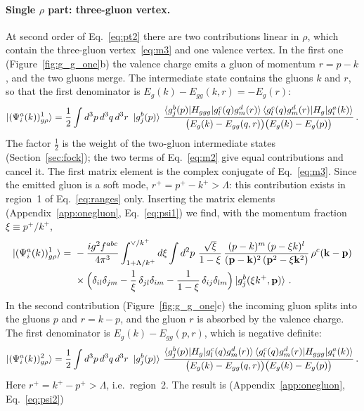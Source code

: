 \paragraph{Single $\rho$ part: three-gluon vertex.} At second order of Eq.~\eqref{eq:pt2} there are two contributions linear in $\rho$, which contain the three-gluon vertex~\eqref{eq:m3} and one valence vertex. In the first one (Figure~\ref{fig:g_g_one}b) the valence charge emits a gluon of momentum $r=p-k$, and the two gluons merge. The intermediate state contains the gluons $k$ and $r$, so that the first denominator is $E_g(k)-E_{gg}(k,r)=-E_g(r)$:
\begin{align}\label{eq:psi1_def}
\ket{(\Psi^a_i(k))^1_{g\rho}}=\frac12\int d^3p\,d^3q\,d^3r\ \ket{g^b_j(p)}\,
\frac{\braket{g^b_j(p)|H_{ggg}|g^c_l(q)g^d_m(r)}\braket{g^c_l(q)g^d_m(r)|H_g|g^a_i(k)}}{\big(E_g(k)-E_{gg}(q,r)\big)\big(E_g(k)-E_g(p)\big)}\,.
\end{align}
The factor $\frac12$ is the weight of the two-gluon intermediate states (Section~\ref{sec:fock}); the two terms of Eq.~\eqref{eq:m2} give equal contributions and cancel it. The first matrix element is the complex conjugate of Eq.~\eqref{eq:m3}. Since the emitted gluon is a soft mode, $r^+=p^+-k^+>\Lambda$: this contribution exists in region~1 of Eq.~\eqref{eq:ranges} only. Inserting the matrix elements (Appendix~\ref{app:onegluon}, Eq.~\eqref{eq:psi1}) we find, with the momentum fraction $\xi\equiv p^+/k^+$,
\begin{align}\label{eq:psi1_xi}
\ket{(\Psi^a_i(k))^1_{g\rho}}=\ &-\frac{ig^2f^{abc}}{4\pi^3}\int_{1+\Lambda/k^+}^{\vee/k^+}d\xi\int d^2p\ \frac{\sqrt\xi}{1-\xi}\,\frac{(p-k)^m\,(p-\xi k)^l}{(\v p-\v k)^2\,(\v p^2-\xi\v k^2)}\,\rho^c(\v k-\v p)\notag\\
&\times\Big(\delta_{il}\delta_{jm}-\frac1\xi\,\delta_{jl}\delta_{im}-\frac{1}{1-\xi}\,\delta_{ij}\delta_{lm}\Big)\ket{g^b_j(\xi k^+,\v p)}\,.
\end{align}
In the second contribution (Figure~\ref{fig:g_g_one}c) the incoming gluon splits into the gluons $p$ and $r=k-p$, and the gluon $r$ is absorbed by the valence charge. The first denominator is $E_g(k)-E_{gg}(p,r)$, which is negative definite:
\begin{align}\label{eq:psi2_def}
\ket{(\Psi^a_i(k))^2_{g\rho}}=\frac12\int d^3p\,d^3q\,d^3r\ \ket{g^b_j(p)}\,
\frac{\braket{g^b_j(p)|H_g|g^c_l(q)g^d_m(r)}\braket{g^c_l(q)g^d_m(r)|H_{ggg}|g^a_i(k)}}{\big(E_g(k)-E_{gg}(q,r)\big)\big(E_g(k)-E_g(p)\big)}\,.
\end{align}
Here $r^+=k^+-p^+>\Lambda$, i.e.\ region~2. The result is (Appendix~\ref{app:onegluon}, Eq.~\eqref{eq:psi2})
